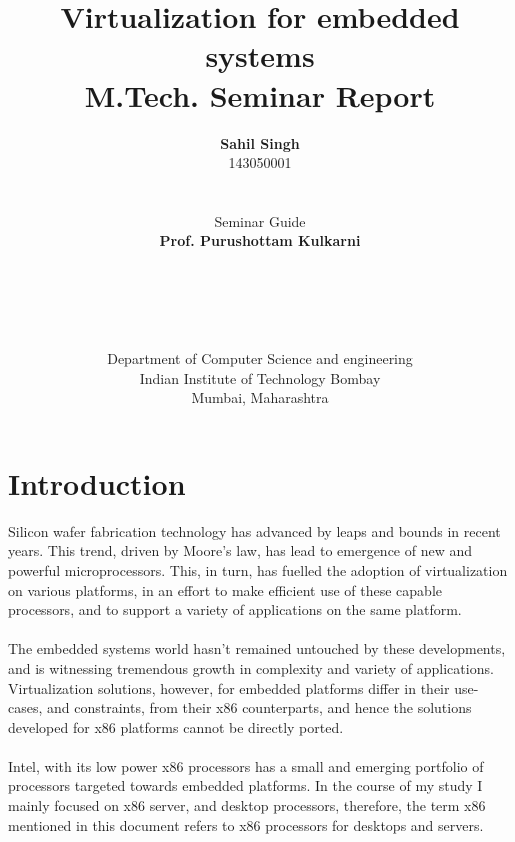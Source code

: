 \documentclass[a4paper,10pt]{article}
\title{\textbf{Virtualization for embedded systems}\\M.Tech. Seminar Report}
\author{\textbf{Sahil Singh}\\143050001\\\\\\Seminar Guide\\\textbf{Prof. Purushottam Kulkarni}\\\\\\\\\\\\Department of Computer Science and engineering\\Indian Institute of Technology Bombay\\Mumbai, Maharashtra}
\date{}
\begin{document}
\maketitle
\newpage
 

\tableofcontents
\newpage
\section{Introduction}
Silicon wafer fabrication technology has advanced by leaps and bounds in recent years.
This trend, driven by Moore's law, has lead to emergence of new and powerful microprocessors.
This, in turn, has fuelled the adoption of virtualization on various platforms, in an effort to make efficient use of these capable processors, and to support a variety of applications on the same platform.
\\\\
The embedded systems world hasn't remained untouched by these developments, and is witnessing tremendous growth in  complexity and variety of applications.
Virtualization solutions, however, for embedded platforms differ in their use-cases, and constraints, from their x86 counterparts, and hence the solutions developed for x86 platforms cannot be directly ported.
\\\\
Intel, with its low power x86 processors has a small and emerging portfolio of processors targeted towards embedded platforms.
In the course of my study I mainly focused on x86 server, and desktop processors, therefore, the term x86 mentioned in this document refers to x86 processors for desktops and servers.
 
\end{document}
